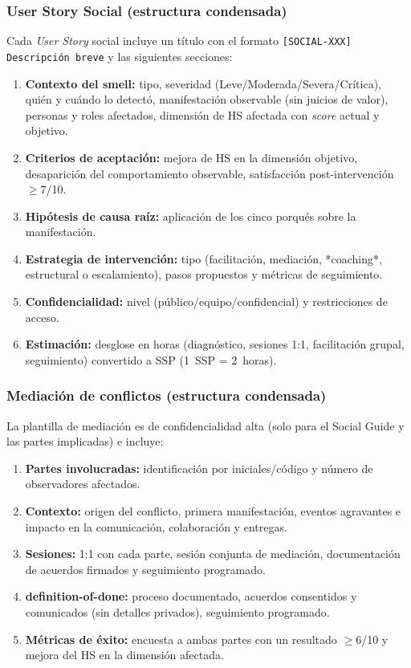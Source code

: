 \subsubsection{User Story Social (estructura condensada)}

Cada \textit{User Story} social incluye un título con el formato \texttt{[SOCIAL-XXX] Descripción breve} y las siguientes secciones:

\begin{enumerate}[nosep]
    \item \textbf{Contexto del smell:} tipo, severidad (Leve/Moderada/Severa/Crítica), quién y cuándo lo detectó, manifestación observable (sin juicios de valor), personas y roles afectados, dimensión de HS afectada con \textit{score} actual y objetivo.
    \item \textbf{Criterios de aceptación:} mejora de HS en la dimensión objetivo, desaparición del comportamiento observable, satisfacción post-intervención $\geq 7$/10.
    \item \textbf{Hipótesis de causa raíz:} aplicación de los cinco porqués sobre la manifestación.
    \item \textbf{Estrategia de intervención:} tipo (facilitación, mediación, *coaching*, estructural o escalamiento), pasos propuestos y métricas de seguimiento.
    \item \textbf{Confidencialidad:} nivel (público/equipo/confidencial) y restricciones de acceso.
    \item \textbf{Estimación:} desglose en horas (diagnóstico, sesiones 1:1, facilitación grupal, seguimiento) convertido a SSP (1~SSP = 2~horas).
\end{enumerate}

\subsubsection{Mediación de conflictos (estructura condensada)}

La plantilla de mediación es de confidencialidad alta (solo para el Social Guide y las partes implicadas) e incluye:
\begin{enumerate}[nosep]
    \item \textbf{Partes involucradas:} identificación por iniciales/código y número de observadores afectados.
    \item \textbf{Contexto:} origen del conflicto, primera manifestación, eventos agravantes e impacto en la comunicación, colaboración y entregas.
    \item \textbf{Sesiones:} 1:1 con cada parte, sesión conjunta de mediación, documentación de acuerdos firmados y seguimiento programado.
    \item \textbf{\gls{definition-of-done}:} proceso documentado, acuerdos consentidos y comunicados (sin detalles privados), seguimiento programado.
    \item \textbf{Métricas de éxito:} encuesta a ambas partes con un resultado $\geq 6$/10 y mejora del HS en la dimensión afectada.
\end{enumerate}

